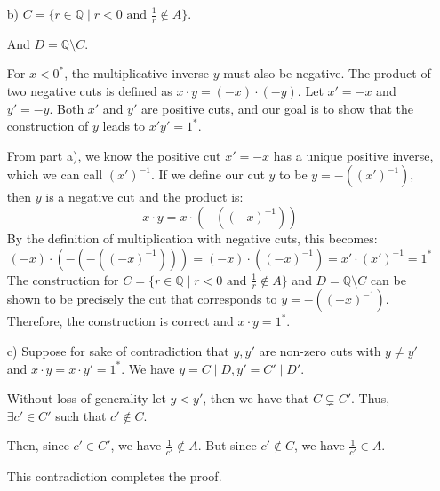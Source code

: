 \documentclass[11pt]{article}
\newcommand{\bbQ}{\mathbb{Q}}
\renewcommand{\_}[1]{\underline{ #1 }}
\theoremstyle{definition}
\numberwithin{equation}{subsection}
\begin{document}
{\begin{enumerate}
Since $P \subseteq L_1$ and $L_1 \subseteq P$, we have $P = L_1$, and therefore $x \cdot y = 1^*$.

\item[b)] $C= \{r\in \bbQ \mid r<0 \text{ and } \frac{1}{r}\notin A\}$.

And $D=\bbQ \setminus C$.

For $x < 0^*$, the multiplicative inverse $y$ must also be negative. The product of two negative cuts is defined as $x \cdot y = (-x) \cdot (-y)$. Let $x' = -x$ and $y' = -y$. Both $x'$ and $y'$ are positive cuts, and our goal is to show that the construction of $y$ leads to $x'y'=1^*$.

From part a), we know the positive cut $x'=-x$ has a unique positive inverse, which we can call $(x')^{-1}$. If we define our cut $y$ to be $y = -( (x')^{-1} )$, then $y$ is a negative cut and the product is:
$$x \cdot y = x \cdot \left(-\left( (-x)^{-1} \right)\right)$$
By the definition of multiplication with negative cuts, this becomes:
$$(-x) \cdot \left(- \left(-\left( (-x)^{-1} \right)\right)\right) = (-x) \cdot \left((-x)^{-1}\right) = x' \cdot (x')^{-1} = 1^*$$
The construction for $C=\{r\in \bbQ \mid r<0 \text{ and } \frac{1}{r}\notin A\}$ and $D = \mathbb{Q}\setminus C$ can be shown to be precisely the cut that corresponds to $y = -((-x)^{-1})$. Therefore, the construction is correct and $x \cdot y = 1^*$.

\item[c)] Suppose for sake of contradiction that $y,y'$ are non-zero cuts with $y\neq y'$ and $x\cdot y=x\cdot y'=1^*$. We have $y=C\mid D, y'=C'\mid D'$.

Without loss of generality let $y<y'$, then we have that $C \subsetneq C'$. Thus, $\exists c'\in C'$ such that $c' \notin C$.

Then, since $c'\in C'$, we have $\frac{1}{c'}\notin A$. But since $c'\notin C$, we have $\frac{1}{c'}\in A$. 

This contradiction completes the proof.

\end{enumerate}

}
\end{document}
